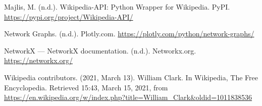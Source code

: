 \documentclass[fontsize=11pt]{article}
\begin{document}
Majlis, M. (n.d.). Wikipedia-API: Python Wrapper for Wikipedia. PyPI. \href{https://pypi.org/project/Wikipedia-API/}{https://pypi.org/project/Wikipedia-API/}

\noindent Network Graphs. (n.d.). Plotly.com. \href{https://plotly.com/python/network-graphs/}{https://plotly.com/python/network-graphs/}

\noindent NetworkX — NetworkX documentation. (n.d.). Networkx.org. \href{https://networkx.org/}{https://networkx.org/}

\noindent Wikipedia contributors. (2021, March 13). William Clark. In Wikipedia, The Free Encyclopedia. Retrieved 15:43, March 15, 2021, from \href{https://en.wikipedia.org/w/index.php?title=William_Clark&oldid=1011838536}{https://en.wikipedia.org/w/index.php?title=William\_Clark\&oldid=1011838536}
\end{document}
